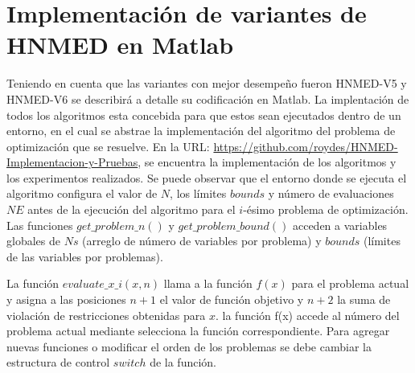 
\chapter{Implementación de variantes de HNMED en Matlab} %

\label{AppendixA} %

Teniendo en cuenta que las variantes con mejor desempeño fueron HNMED-V5 y HNMED-V6 se describirá a detalle su codificación en Matlab. La implentación de todos los algoritmos esta concebida para que estos sean ejecutados dentro de un entorno, en el cual se abstrae la implementación del algoritmo del problema de optimización que se resuelve. En la URL:  \url{https://github.com/roydes/HNMED-Implementacion-y-Pruebas}, se encuentra la implementación de los algoritmos y los experimentos realizados. Se puede observar que el entorno donde se ejecuta el algoritmo configura el valor de $N$, los límites $bounds$ y número de evaluaciones $NE$ antes de la ejecución del algoritmo para el $i$-ésimo problema de optimización. Las funciones $get\_problem\_n()$ y $get\_problem\_bound()$ acceden a variables globales  de $Ns$ (arreglo de número de variables por problema) y $bounds$ (límites de las variables por problemas).

 La función $evaluate\_x\_i(x,n)$ llama a la función $f(x)$ para el problema actual y asigna a las posiciones $n+1$ el valor de función objetivo y $n+2$ la suma de violación de restricciones obtenidas para  $x$. la función f(x) accede al número del problema actual mediante selecciona la función correspondiente. Para agregar nuevas funciones o modificar el orden de los problemas se debe cambiar la estructura de control $switch$ de la función.
 
